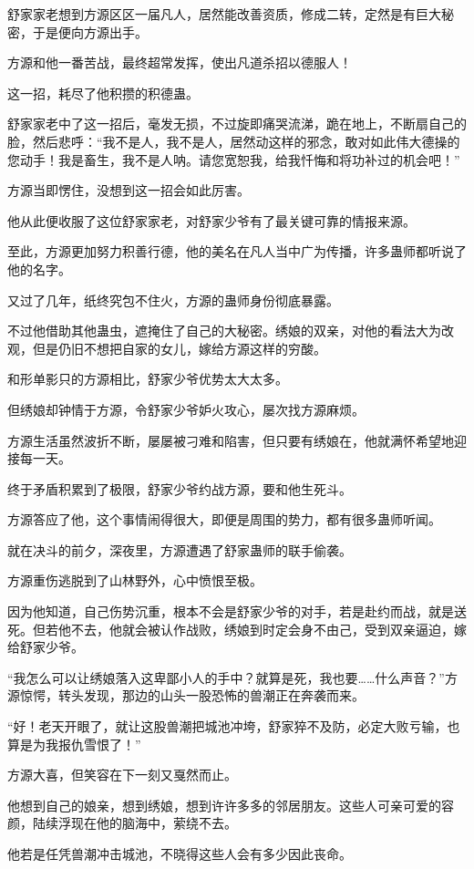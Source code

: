 \begin{this_body}
舒家家老想到方源区区一届凡人，居然能改善资质，修成二转，定然是有巨大秘密，于是便向方源出手。

方源和他一番苦战，最终超常发挥，使出凡道杀招以德服人！

这一招，耗尽了他积攒的积德蛊。

舒家家老中了这一招后，毫发无损，不过旋即痛哭流涕，跪在地上，不断扇自己的脸，然后悲呼：“我不是人，我不是人，居然动这样的邪念，敢对如此伟大德操的您动手！我是畜生，我不是人呐。请您宽恕我，给我忏悔和将功补过的机会吧！”

方源当即愣住，没想到这一招会如此厉害。

他从此便收服了这位舒家家老，对舒家少爷有了最关键可靠的情报来源。

至此，方源更加努力积善行德，他的美名在凡人当中广为传播，许多蛊师都听说了他的名字。

又过了几年，纸终究包不住火，方源的蛊师身份彻底暴露。

不过他借助其他蛊虫，遮掩住了自己的大秘密。绣娘的双亲，对他的看法大为改观，但是仍旧不想把自家的女儿，嫁给方源这样的穷酸。

和形单影只的方源相比，舒家少爷优势太大太多。

但绣娘却钟情于方源，令舒家少爷妒火攻心，屡次找方源麻烦。

方源生活虽然波折不断，屡屡被刁难和陷害，但只要有绣娘在，他就满怀希望地迎接每一天。

终于矛盾积累到了极限，舒家少爷约战方源，要和他生死斗。

方源答应了他，这个事情闹得很大，即便是周围的势力，都有很多蛊师听闻。

就在决斗的前夕，深夜里，方源遭遇了舒家蛊师的联手偷袭。

方源重伤逃脱到了山林野外，心中愤恨至极。

因为他知道，自己伤势沉重，根本不会是舒家少爷的对手，若是赴约而战，就是送死。但若他不去，他就会被认作战败，绣娘到时定会身不由己，受到双亲逼迫，嫁给舒家少爷。

“我怎么可以让绣娘落入这卑鄙小人的手中？就算是死，我也要……什么声音？”方源惊愕，转头发现，那边的山头一股恐怖的兽潮正在奔袭而来。

“好！老天开眼了，就让这股兽潮把城池冲垮，舒家猝不及防，必定大败亏输，也算是为我报仇雪恨了！”

方源大喜，但笑容在下一刻又戛然而止。

他想到自己的娘亲，想到绣娘，想到许许多多的邻居朋友。这些人可亲可爱的容颜，陆续浮现在他的脑海中，萦绕不去。

他若是任凭兽潮冲击城池，不晓得这些人会有多少因此丧命。


\end{this_body}
